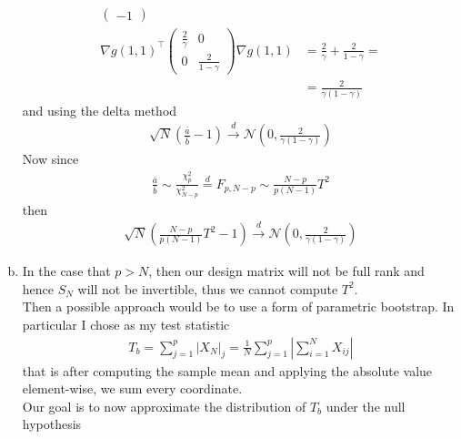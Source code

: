 \documentclass[10pt,notitlepage]{article}
\newcommand{\abs}[1]{\left\vert#1\right\vert}
\begin{document}
\begin{exercise}[Solution]
\begin{enumerate}[(a)]
\begin{align*}
\begin{pmatrix}
                            -1
                        \end{pmatrix}\\
                        \nabla g(1,1)^\top 
                        \begin{pmatrix}
                            \frac{2}{\gamma} & 0\\
                            0 & \frac{2}{1-\gamma}
                        \end{pmatrix}
                        \nabla g(1,1) &= \frac{2}{\gamma}+\frac{2}{1-\gamma}=\\
                        &= \frac{2}{\gamma(1-\gamma)}
                    \end{align*}
                    and using the delta method
                    \begin{align*}
                        \sqrt{N}\left(\frac{\bar{a}}{\bar{b}}-1\right)\overset{d}{\longrightarrow}\mathcal{N}\left(0,\frac{2}{\gamma(1-\gamma)}\right)
                    \end{align*}
                    Now since 
                    \begin{align*}
                        \frac{\bar{a}}{\bar{b}}\sim\frac{\chi_p^2}{\chi_{N-p}^2} \overset{d}{=} F_{p,N-p} \sim \frac{N-p}{p(N-1)}T^2
                    \end{align*}
                    then
                    \begin{align*}
                        \sqrt{N}\left(\frac{N-p}{p(N-1)}T^2-1\right)\overset{d}{\longrightarrow}\mathcal{N}\left(0,\frac{2}{\gamma(1-\gamma)}\right)
                    \end{align*}
            \item In the case that $p>N$, then our design matrix will not be full rank and hence $S_N$ will not be invertible, thus we cannot compute $T^2$.\\
                    Then a possible approach would be to use a form of parametric bootstrap. In particular I chose as my test statistic 
                    \begin{align*}
                        T_b = \sum_{j=1}^{p} \abs{X_N}_j = \frac{1}{N}\sum_{j=1}^{p}\abs{\sum_{i=1}^{N} X_{ij}}
                    \end{align*}
                    that is after computing the sample mean and applying the absolute value element-wise, we sum every coordinate.\\
                    Our goal is to now approximate the distribution of $T_b$ under the null hypothesis

\end{enumerate}
\end{exercise}
\end{document}
